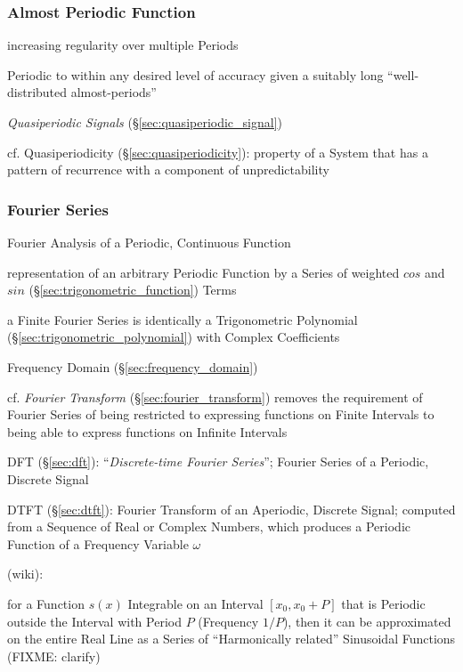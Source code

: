 \subsubsection{Almost Periodic Function}\label{sec:almost_periodic}

increasing regularity over multiple Periods

Periodic to within any desired level of accuracy given a suitably long
``well-distributed almost-periods''

\emph{Quasiperiodic Signals} (\S\ref{sec:quasiperiodic_signal})

cf. Quasiperiodicity (\S\ref{sec:quasiperiodicity}): property of a System that
has a pattern of recurrence with a component of unpredictability



\subsubsection{Fourier Series}\label{sec:fourier_series}

Fourier Analysis of a Periodic, Continuous Function

representation of an arbitrary Periodic Function by a Series of weighted $cos$
and $sin$ (\S\ref{sec:trigonometric_function}) Terms

a Finite Fourier Series is identically a Trigonometric Polynomial
(\S\ref{sec:trigonometric_polynomial}) with Complex Coefficients

\fist Frequency Domain (\S\ref{sec:frequency_domain})

\fist cf. \emph{Fourier Transform} (\S\ref{sec:fourier_transform}) removes the
requirement of Fourier Series of being restricted to expressing functions on
Finite Intervals to being able to express functions on Infinite Intervals

DFT (\S\ref{sec:dft}): ``\emph{Discrete-time Fourier Series}''; Fourier Series
of a Periodic, Discrete Signal

DTFT (\S\ref{sec:dtft}): Fourier Transform of an Aperiodic, Discrete Signal;
computed from a Sequence of Real or Complex Numbers, which produces a Periodic
Function of a Frequency Variable $\omega$


(wiki):

for a Function $s(x)$ Integrable on an Interval $[x_0,x_0 + P]$ that is
Periodic outside the Interval with Period $P$ (Frequency $1/P$), then it can be
approximated on the entire Real Line as a Series of ``Harmonically related''
Sinusoidal Functions (FIXME: clarify)

